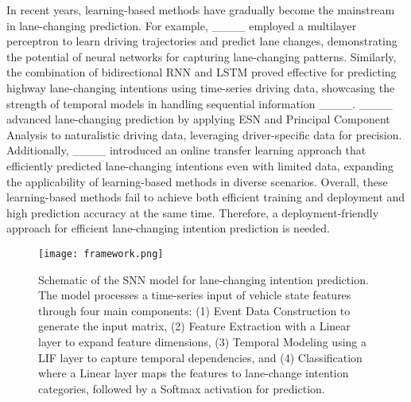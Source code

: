 In recent years, learning-based methods have gradually become the mainstream in lane-changing prediction.
For example, ____ employed a multilayer perceptron to learn driving trajectories and predict lane changes, demonstrating the potential of neural networks for capturing lane-changing patterns. Similarly, the combination of bidirectional RNN and LSTM proved effective for predicting highway lane-changing intentions using time-series driving data, showcasing the strength of temporal models in handling sequential information ____.
____ advanced lane-changing prediction by applying ESN and Principal Component Analysis to naturalistic driving data, leveraging driver-specific data for precision. Additionally, ____ introduced an online transfer learning approach that efficiently predicted lane-changing intentions even with limited data, expanding the applicability of learning-based methods in diverse scenarios.
Overall, these learning-based methods fail to achieve both efficient training and deployment and high prediction accuracy at the same time.
Therefore, a deployment-friendly approach for efficient lane-changing intention prediction is needed.

\begin{figure*}[t]
    \centering
    \texttt{[image: framework.png]}
    \caption{Schematic of the SNN model for lane-changing intention prediction. The model processes a time-series input of vehicle state features through four main components: (1) Event Data Construction to generate the input matrix, (2) Feature Extraction with a Linear layer to expand feature dimensions, (3) Temporal Modeling using a LIF layer to capture temporal dependencies, and (4) Classification where a Linear layer maps the features to lane-change intention categories, followed by a Softmax activation for prediction.}
    \label{framework}
\end{figure*}

